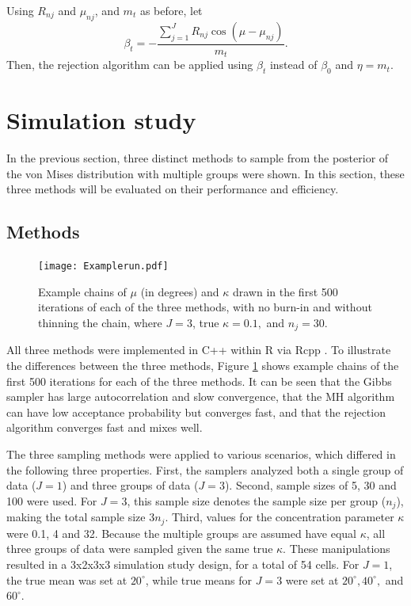 \documentclass[bib]{ba/ba}
\begin{document}
Using $R_{nj}$ and $\mu_{nj}$, and $m_t$ as before, let
$$\beta_t = -  \frac{\sum_{j=1}^{J} R_{nj} \cos (\mu - \mu_{nj})}{m_t}.$$
Then, the rejection algorithm can be applied using $\beta_t$ instead of $\beta_0$ and $\eta = m_t$.




\section{Simulation study \label{simstud}}

In the previous section, three distinct methods to sample from the posterior of the von Mises distribution with multiple groups were shown. In this section, these three methods will be evaluated on their performance and efficiency. 

\subsection{Methods}

\begin{figure}[bt]
\centering
\texttt{[image: Examplerun.pdf]}
\caption{Example chains of $\mu$ (in degrees) and $\kappa$ drawn in the first 500 iterations of each of the three methods, with no burn-in and without thinning the chain, where $J = 3$, true $\kappa = 0.1,$ and $n_j = 30$.}
\label{example}
\end{figure}

All three methods were implemented in C++ within R \citep{team2013r} via Rcpp \citep{rcpp}. To illustrate the differences between the three methods, Figure \ref{example} shows example chains of the first 500 iterations for each of the three methods. It can be seen that the Gibbs sampler has large autocorrelation and slow convergence, that the MH algorithm can have low acceptance probability but converges fast, and that the rejection algorithm converges fast and mixes well. 

The three sampling methods were applied to various scenarios, which differed in the following three properties. First, the samplers  analyzed both a single group of data ($J=1$) and three groups of data ($J=3$). Second, sample sizes of 5, 30 and 100 were used. For $J=3$, this sample size denotes the sample size per group ($n_j$), making the total sample size $3n_j$. Third, values for the concentration parameter $\kappa$ were 0.1, 4 and 32. Because the multiple groups are assumed have equal $\kappa$, all three groups of data were sampled given the same true $\kappa$. These manipulations resulted in a 3x2x3x3 simulation study design, for a total of 54 cells. For $J=1$, the true mean was set at $20^\circ$, while true means for $J=3$ were set at $20^\circ, 40^\circ,$ and $60^\circ$.
\end{document}
